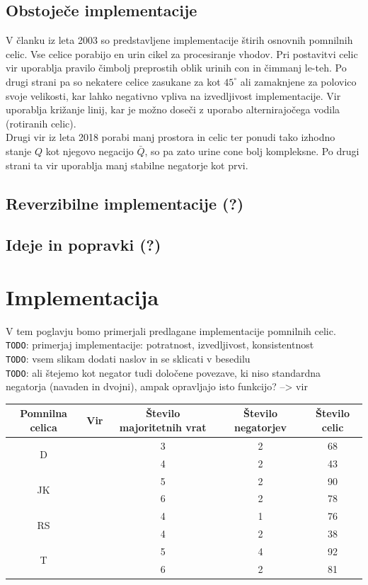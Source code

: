 \documentclass[a4paper, 11pt]{article}
\newcommand{\todo}{\textcolor{BrickRed}{\texttt{TODO}}} %
\begin{document}
\subsection{Obstoječe implementacije}
V članku \cite{quantum_dot} iz leta 2003 so predstavljene implementacije štirih osnovnih pomnilnih celic. Vse celice porabijo en urin cikel za procesiranje vhodov. Pri postavitvi celic vir uporablja pravilo čimbolj preprostih oblik urinih con in čimmanj le-teh. Po drugi strani pa so nekatere celice zasukane za kot $ 45^{\circ} $ ali zamaknjene za polovico svoje velikosti, kar lahko negativno vpliva na izvedljivost implementacije. Vir uporablja križanje linij, kar je možno doseči z uporabo alternirajočega vodila (rotiranih celic). \\ Drugi vir \cite{a_novel_approach} iz leta 2018 porabi manj prostora in celic ter ponudi tako izhodno stanje $Q$ kot njegovo negacijo $\bar{Q}$, so pa zato urine cone bolj kompleksne. Po drugi strani ta vir uporablja manj stabilne negatorje kot prvi.

\subsection{Reverzibilne implementacije (?)}

\subsection{Ideje in popravki (?)}


\section{Implementacija}
V tem poglavju bomo primerjali predlagane implementacije pomnilnih celic.\\
\todo: primerjaj implementacije: potratnost, izvedljivost, konsistentnost\\
\todo: vsem slikam dodati naslov in se sklicati v besedilu\\
\todo: ali štejemo kot negator tudi določene povezave, ki niso standardna negatorja (navaden in dvojni), ampak opravljajo isto funkcijo? --> vir \cite{quantum_dot}

\begin{tabular}{|c|c|c|c|c|}
\hline 
Pomnilna celica & Vir & Število majoritetnih vrat & Število negatorjev & Število celic \\ 
\hline 
\multirow{2}{*}{D} & \cite{quantum_dot} & 3 & 2 & 68 \\ 
& \cite{a_novel_approach} & 4 & 2 & 43 \\ 
\hline 
\multirow{2}{*}{JK} & \cite{quantum_dot} & 5 & 2 & 90 \\ 
& \cite{a_novel_approach} & 6 & 2 & 78 \\ 
\hline 
\multirow{2}{*}{RS} & \cite{quantum_dot} & 4 & 1 & 76 \\ 
& \cite{a_novel_approach} & 4 & 2 & 38 \\ 
\hline 
\multirow{2}{*}{T} & \cite{quantum_dot} & 5 & 4 & 92 \\  
& \cite{a_novel_approach} & 6 & 2 & 81 \\ 
\hline 
\end{tabular} 
\end{document}
